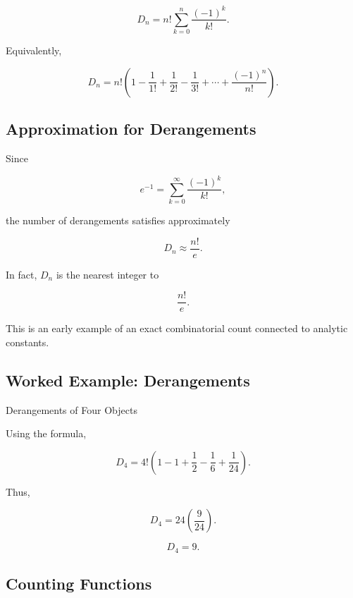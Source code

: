 \[
\boxed{
D_n
=
n!
\sum_{k=0}^{n}\frac{(-1)^k}{k!}.
}
\]

Equivalently,

\[
\boxed{
D_n
=
n!
\left(
1-\frac1{1!}
+\frac1{2!}
-\frac1{3!}
+\cdots
+\frac{(-1)^n}{n!}
\right).
}
\]

\subsection{Approximation for Derangements}
\label{subsec:derangement-approximation}

Since

\[
e^{-1}
=
\sum_{k=0}^{\infty}
\frac{(-1)^k}{k!},
\]

the number of derangements satisfies approximately

\[
\boxed{
D_n\approx\frac{n!}{e}.
}
\]

In fact, \(D_n\) is the nearest integer to

\[
\frac{n!}{e}.
\]

This is an early example of an exact combinatorial count connected to
analytic constants.

\subsection{Worked Example: Derangements}
\label{subsec:worked-derangements}

\begin{workedexamplebox}{Derangements of Four Objects}

Using the formula,

\[
D_4
=
4!
\left(
1-1+\frac12-\frac16+\frac1{24}
\right).
\]

Thus,

\[
D_4
=
24
\left(
\frac{9}{24}
\right).
\]

\begin{answerbox}
\[
\boxed{
D_4=9.
}
\]
\end{answerbox}

\end{workedexamplebox}

\subsection{Counting Functions}
\label{subsec:counting-functions}

